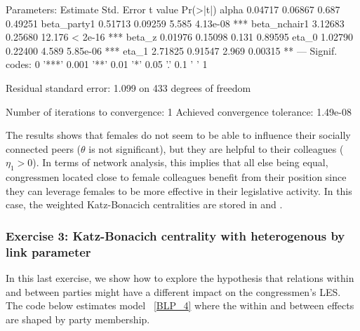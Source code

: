 \documentclass[nojss]{jss}
\begin{document}
\begin{CodeChunk}
\begin{CodeOutput}
Parameters:
Estimate Std. Error t value Pr(>|t|)    
alpha         0.04717    0.06867   0.687  0.49251    
beta_party1   0.51713    0.09259   5.585 4.13e-08 ***
beta_nchair1  3.12683    0.25680  12.176  < 2e-16 ***
beta_z        0.01976    0.15098   0.131  0.89595    
eta_0         1.02790    0.22400   4.589 5.85e-06 ***
eta_1         2.71825    0.91547   2.969  0.00315 ** 
---
Signif. codes:  0 '***' 0.001 '**' 0.01 '*' 0.05 '.' 0.1 ' ' 1

Residual standard error: 1.099 on 433 degrees of freedom

Number of iterations to convergence: 1 
Achieved convergence tolerance: 1.49e-08
\end{CodeOutput}
\end{CodeChunk}
The results shows that females do not seem to be able to influence their socially connected peers ($\theta$ is not significant), but they are helpful to their colleagues ($\eta_{1}>0$). In terms of network analysis, this implies that all else being equal, congressmen located close to female colleagues benefit from their position since they can leverage females to be more effective in their legislative activity. In this case, the weighted Katz-Bonacich centralities are stored in 
and .

\subsubsection{Exercise 3: Katz-Bonacich centrality with heterogenous by link parameter}

In this last exercise, we show how to explore the hypothesis that relations within and between parties might have a different impact on the congressmen's LES. The code below estimates model ~\ref{BLP_4} where the within and between effects are shaped by party membership.
\end{document}
